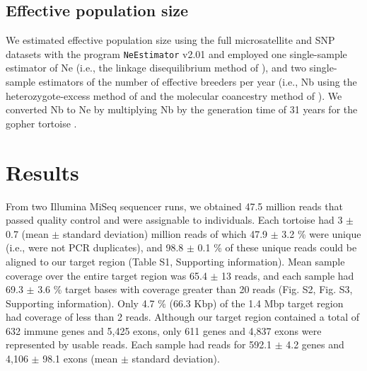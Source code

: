 \documentclass[english]{article}\usepackage[]{graphicx}\usepackage[]{color}
\begin{document}
\subsection*{Effective population size}
We estimated effective population size using the full microsatellite and SNP datasets with the program \texttt{NeEstimator} v2.01 \citep{Do_et_al_2014} and employed one single-sample estimator of Ne (i.e., the linkage disequilibrium method of \citet{Waples_and_Do_2008}), and two single-sample estimators of the number of effective breeders per year (i.e., Nb using the heterozygote-excess method of \citet{Zhdanova_and_Pudovkin_2008} and the molecular coancestry method of \citet{Nomura_2008}). We converted Nb to Ne by multiplying Nb by the generation time of 31 years for the gopher tortoise \citep{Enge_et_al_2006}.

\section*{Results}
From two Illumina MiSeq sequencer runs, we obtained 47.5 million reads that passed quality control and were assignable to individuals. Each tortoise had 3 \begin{math}\pm\end{math} 0.7 (mean \begin{math}\pm\end{math} standard deviation) million reads of which 47.9 \begin{math}\pm\end{math} 3.2 \% were unique (i.e., were not PCR duplicates), and 98.8 \begin{math}\pm\end{math} 0.1 \% of these unique reads could be aligned to our target region (Table S1, Supporting information). Mean sample coverage over the entire target region was 65.4 \begin{math}\pm\end{math} 13 reads, and each sample had 69.3 \begin{math}\pm\end{math} 3.6 \% target bases with coverage greater than 20 reads (Fig. S2, Fig. S3, Supporting information). Only 4.7 \% (66.3 Kbp) of the 1.4 Mbp target region had coverage of less than 2 reads. Although our target region contained a total of 632 immune genes and 5,425 exons, only 611 genes and 4,837 exons were represented by usable reads. Each sample had reads for 592.1 \begin{math}\pm\end{math} 4.2 genes and 4,106 \begin{math}\pm\end{math} 98.1 exons (mean \begin{math}\pm\end{math} standard deviation).
\end{document}
